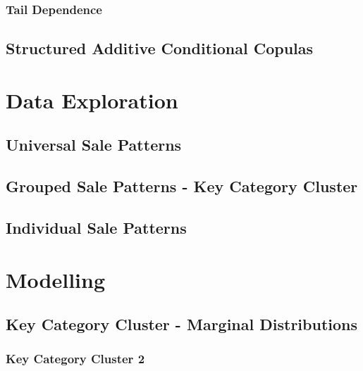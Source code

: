 \documentclass[11pt, twoside]{article}
\numberwithin{equation}{section}
\numberwithin{table}{section}
\numberwithin{figure}{section}
\begin{document}
\subsubsection{Tail Dependence} \label{sssec:tail_dependence}

\subsection{Structured Additive Conditional Copulas} \label{ssec:conditional_copulas}

%
\newpage
\thispagestyle{empty}
\cleardoublepage


\thispagestyle{plain}
\section{Data Exploration} \label{sec:data_exploration}

\subsection{Universal Sale Patterns} \label{ssec:universal_patterns}

\subsection{Grouped Sale Patterns - Key Category Cluster} \label{ssec:grouped_patterns}

\subsection{Individual Sale Patterns} \label{ssec:individual_patterns}

\newpage
\thispagestyle{empty}
\cleardoublepage

\thispagestyle{plain}
\section{Modelling} \label{sec:modelling}

\subsection{Key Category Cluster - Marginal Distributions} \label{ssec:kcc_margins}

\subsubsection{Key Category Cluster 2} \label{sssec:margin_kcc_2}

\end{document}
